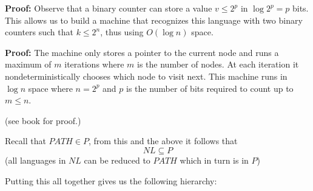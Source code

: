\documentclass[a4paper,blends,pdf,colorBG,slideColor]{prosper}
\begin{document}

{\bf Proof:} Observe that a binary counter can store a value $v \le 2^p$  in $\log  2^p = p$ bits.  This allows us to 
build a machine that recognizes this language with two binary counters such that $k \le 2^n$, thus using $O(\log n)$ space.
\es

{\bf Proof:} The machine only stores a pointer to the current node and runs a maximum of $m$
iterations where $m$ is the number of nodes.  At each iteration it nondeterministically chooses which
node to visit next.  This machine runs in $\log n$ space where $n = 2^p$ and $p$ is the number of bits required to
count up to $m \le n$.
\es


\vspace{.2in}


\vspace{.2in}
\es

(see book for proof.)

Recall that $PATH \in P$, from this and the above it follows that
\[
NL \subseteq P
\]
 (all languages in $NL$ can be reduced to $PATH$ which
in turn is in $P$)
\es


Putting this all together gives us the following hierarchy:
\es
\end{document}

